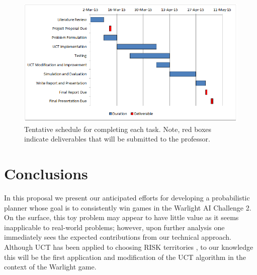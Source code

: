 \documentclass[a4paper,11pt]{article}
\begin{document}
%
\begin{figure}[htbp]
  \centering
  \includegraphics[width=0.95\columnwidth]{gantt_chart}
  \caption{Tentative schedule for completing each task. Note, red boxes indicate deliverables that will be submitted to the professor.}
  \label{fig:schedule}
\end{figure}


%
\section{Conclusions}\label{sec:conclusions}
In this proposal we present our anticipated efforts for developing a probabilistic planner whose goal is to consistently win games in the Warlight AI Challenge 2. On the surface, this toy problem may appear to have little value as it seems inapplicable to real-world problems; however, upon further analysis one immediately sees the expected contributions from our technical approach.  Although UCT has been applied to choosing RISK territories \cite{riskalb}, to our knowledge this will be the first application and modification of the UCT algorithm in the context of the Warlight game. 




\end{document}
